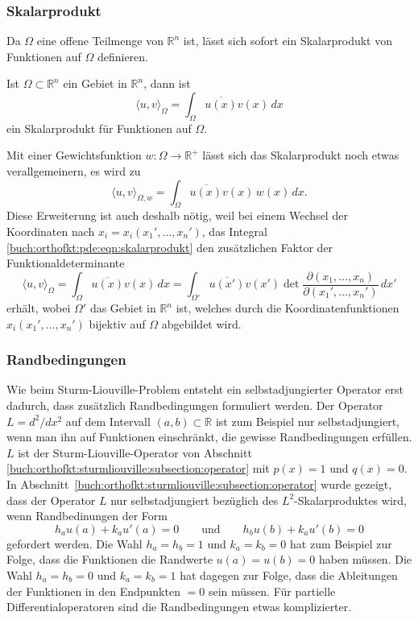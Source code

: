 %
%
\subsubsection{Skalarprodukt}
Da $\Omega$ eine offene Teilmenge von $\mathbb{R}^n$ ist, lässt sich
sofort ein Skalarprodukt von Funktionen auf $\Omega$ definieren.

\begin{definition}
Ist $\Omega\subset \mathbb{R}^n$ ein Gebiet in $\mathbb{R}^n$, dann ist
\begin{equation}
\langle u,v\rangle_\Omega
=
\int_{\Omega}  \overline{u(x)} v(x)\,dx
\label{buch:orthofkt:pde:eqn:skalarprodukt}
\end{equation}
ein Skalarprodukt für Funktionen auf $\Omega$.
\end{definition}

Mit einer Gewichtsfunktion $w\colon \Omega \to \mathbb{R}^+$ lässt sich
das Skalarprodukt noch etwas verallgemeinern, es wird zu
\[
\langle u,v\rangle_{\Omega,w}
=
\int_{\Omega} \overline{u(x)}v(x)\,w(x)\,dx.
\]
Diese Erweiterung ist auch deshalb nötig, weil bei einem Wechsel
der Koordinaten nach $x_i=x_i(x_1',\dots,x_n')$, das Integral
\eqref{buch:orthofkt:pde:eqn:skalarprodukt}
den zusätzlichen Faktor der Funktionaldeterminante 
\[
\langle u,v\rangle_{\Omega}
=
\int_{\Omega} \overline{u(x)} v(x)\,dx 
=
\int_{\Omega'} \overline{u(x')} v(x')
\det\frac{\partial(x_1,\dots,x_n)}{\partial(x_1',\dots,x_n')}
\,dx'
\]
erhält, wobei $\Omega'$ das Gebiet in $\mathbb{R}^n$ ist, welches
durch die Koordinatenfunktionen $x_i(x_1',\dots,x_n')$ bijektiv auf
$\Omega$ abgebildet wird.


%
%
\subsubsection{Randbedingungen}
Wie beim Sturm-Liouville-Problem entsteht ein selbstadjungierter Operator
erst dadurch, dass zusätzlich Randbedingungen formuliert werden.
Der Operator $L=d^2/dx^2$ auf dem Intervall $(a,b)\subset\mathbb{R}$
ist zum Beispiel nur selbstadjungiert, wenn man ihn auf Funktionen
einschränkt, die gewisse Randbedingungen erfüllen.
$L$ ist der Sturm-Liouville-Operator von Abschnitt
\ref{buch:orthofkt:sturmliouville:subsection:operator}
mit $p(x)=1$ und $q(x)=0$.
In Abschnitt~\ref{buch:orthofkt:sturmliouville:subsection:operator}
wurde gezeigt, dass der Operator $L$ nur selbstadjungiert bezüglich
des $L^2$-Skalarproduktes wird, wenn Randbedinungen der Form
\begin{equation}
h_a u(a) + k_a u'(a) =  0
\qquad\text{und}\qquad
h_b u(b) + k_a u'(b) =  0
\end{equation}
gefordert werden.
Die Wahl $h_a=h_b=1$ und $k_a=k_b=0$ hat zum Beispiel zur Folge,
dass die Funktionen die Randwerte $u(a)=u(b)=0$ haben müssen.
Die Wahl $h_a=h_b=0$ und $k_a=k_b=1$ hat dagegen zur Folge,
dass die Ableitungen der Funktionen in den Endpunkten $=0$ sein
müssen.
Für partielle Differentialoperatoren sind die Randbedingungen
etwas komplizierter.

